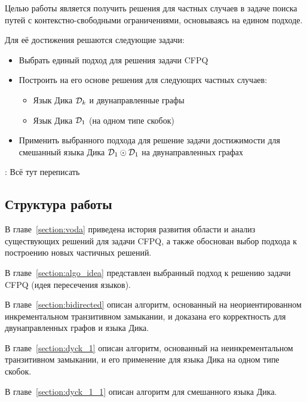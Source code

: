 Целью работы является получить решения для частных случаев в задаче поиска путей с контекстно-свободными ограничениями, основываясь на едином подходе.

Для её достижения решаются следующие задачи:
    \begin{itemize}
      \item Выбрать единый подход для решения задачи CFPQ
      \item Построить на его основе решения для следующих частных случаев:
        \begin{itemize}
          \item Язык Дика $\mathcal{D}_k$ и двунаправленные графы
          \item Язык Дика $\mathcal{D}_1$ (на одном типе скобок)
        \end{itemize}
      \item Применить выбранного подхода для решение задачи достижимости для смешанный языка Дика $\mathcal{D}_1 \odot \mathcal{D}_1$ на двунаправленных графах
    \end{itemize}

\TODO: Всё тут переписать

\subsection*{Структура работы}

В главе~\ref{section:voda} приведена история развития области и анализ существующих решений для задачи CFPQ, а также обоснован выбор подхода к построению новых частичных решений.

В главе~\ref{section:algo_idea} представлен выбранный подход к решению задачи CFPQ (идея пересечения языков).

В главе~\ref{section:bidirected} описан алгоритм, основанный на неориентированном инкрементальном транзитивном замыкании, и доказана его корректность для двунаправленных графов и языка Дика.

В главе~\ref{section:dyck_1} описан алгоритм, основанный на неинкрементальном транзитивном замыкании, и его применение для языка Дика на одном типе скобок.

В главе~\ref{section:dyck_1_1} описан алгоритм для смешанного языка Дика.
